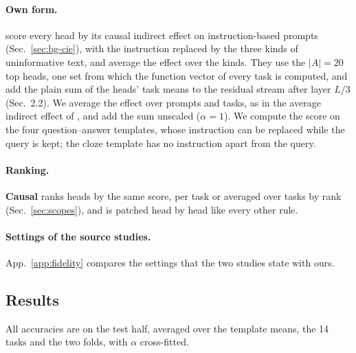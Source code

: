 \documentclass[10pt,a4paper]{article}
\begin{document}
\paragraph{Own form.} \citet{davidson2025different} score every head by its causal indirect effect on instruction-based prompts (Sec.~\ref{sec:bg-cie}), with the instruction replaced by the three kinds of uninformative text, and average the effect over the kinds. They use the $|A|=20$ top heads, one set from which the function vector of every task is computed, and add the plain sum of the heads' task means to the residual stream after layer $L/3$ (Sec.~2.2). We average the effect over prompts and tasks, as in the average indirect effect of \citet{todd2024function}, and add the sum unscaled ($\alpha=1$). We compute the score on the four question--answer templates, whose instruction can be replaced while the query is kept; the cloze template has no instruction apart from the query.

\paragraph{Ranking.} \textbf{Causal} ranks heads by the same score, per task or averaged over tasks by rank (Sec.~\ref{sec:scopes}), and is patched head by head like every other rule.

\paragraph{Settings of the source studies.} App.~\ref{app:fidelity} compares the settings that the two studies state with ours.

\subsection{Results}\label{sec:published-results}

All accuracies are on the test half, averaged over the template means, the 14 tasks and the two folds, with $\alpha$ cross-fitted.

\begin{table}[tbp]
\centering\footnotesize\setlength{\tabcolsep}{4pt}

\caption{The two methods in their own form. Control: the same heads patched with the related task's means. Random: sets with as many heads in each layer. The first two rows differ in size, scope and intervention and are not compared with each other; the third differs from the second only in the score that ranks the heads (Sec.~\ref{sec:causal-zs}).}
\label{tab:own}
\end{table}
\end{document}
